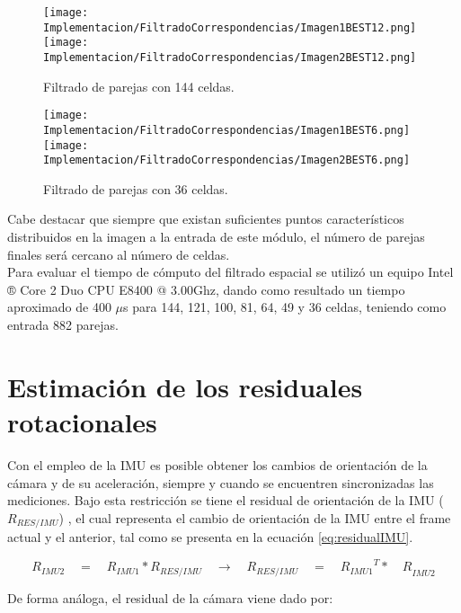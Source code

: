 \begin{figure}[H]
	
	\texttt{[image: Implementacion/FiltradoCorrespondencias/Imagen1BEST12.png]}
	\texttt{[image: Implementacion/FiltradoCorrespondencias/Imagen2BEST12.png]}
	\caption{Filtrado de parejas con 144 celdas.}
	\label{fig:my_label}
\end{figure}


\begin{figure}[H]
	
	\texttt{[image: Implementacion/FiltradoCorrespondencias/Imagen1BEST6.png]}
	\texttt{[image: Implementacion/FiltradoCorrespondencias/Imagen2BEST6.png]}
	\caption{Filtrado de parejas con 36 celdas.}
	\label{fig:my_label}
\end{figure}

Cabe destacar que siempre que existan suficientes puntos característicos distribuidos en la imagen a la entrada de este módulo, el número de parejas finales será cercano al número de celdas. \\

Para evaluar el tiempo de cómputo del filtrado espacial se utilizó un equipo Intel ® Core 2 Duo CPU E8400 @ 3.00Ghz, dando como resultado un tiempo aproximado de 400 $\mu$s para 144, 121, 100, 81, 64, 49 y 36 celdas, teniendo como entrada 882 parejas.





\section{Estimación de los residuales rotacionales}

Con el empleo de la IMU es posible obtener los cambios de orientación de la cámara y de su aceleración, siempre y cuando se encuentren sincronizadas las mediciones. Bajo esta restricción se tiene el residual de orientación de la IMU (${R}_{RES/IMU}$) , el cual representa el cambio de orientación de la IMU entre el frame actual y el anterior, tal como se presenta en la ecuación \ref{eq:residualIMU}.


\begin{equation}
{ R }_{ IMU2 }\quad =\quad { R }_{ IMU1 }*{ R }_{ RES/IMU }\quad \rightarrow \quad { R }_{ RES/IMU }\quad =\quad { { { R }_{ IMU1 } }^{ T }*\quad R }_{ IMU2 }
\label{eq:residualIMU} 
\end{equation}

De forma análoga, el residual de la cámara viene dado por:

